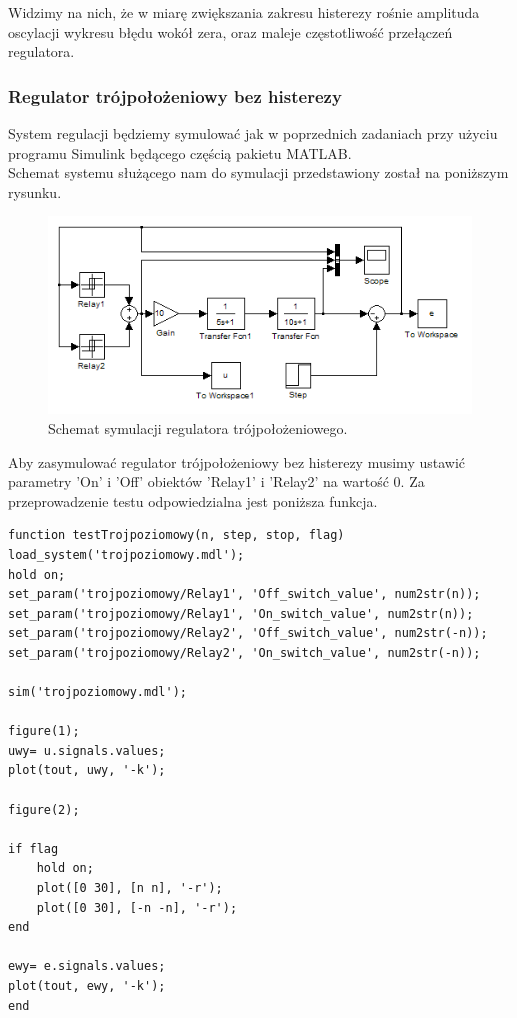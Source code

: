 \documentclass[a4paper,10pt]{article}
\begin{document}
\newpage Widzimy na nich, że w miarę zwiększania zakresu histerezy rośnie amplituda oscylacji wykresu błędu wokół zera, oraz maleje częstotliwość przełączeń regulatora.

\subsubsection{Regulator trójpołożeniowy bez histerezy}\label{sec:r3bh}%

System regulacji będziemy symulować jak w poprzednich zadaniach przy użyciu programu Simulink będącego częścią pakietu M\small ATLAB. \\
\normalsize Schemat systemu służącego nam do symulacji przedstawiony został na poniższym rysunku.

\begin{figure}[!h]
    \centering
	\includegraphics[width=120mm]{CW3-schemat-3.png}
	\caption{Schemat symulacji regulatora trójpołożeniowego.}
    \label{fig:Rysunek}
\end{figure}

Aby zasymulować regulator trójpołożeniowy bez histerezy musimy ustawić parametry 'On' i 'Off' obiektów 'Relay1' i 'Relay2' na wartość 0.
\newpage Za przeprowadzenie testu odpowiedzialna jest poniższa funkcja.

\begin{lstlisting}[caption=Funkcja testująca regulator trójpołożeniowy bez histerezy.]
function testTrojpoziomowy(n, step, stop, flag)
load_system('trojpoziomowy.mdl');
hold on;
set_param('trojpoziomowy/Relay1', 'Off_switch_value', num2str(n));
set_param('trojpoziomowy/Relay1', 'On_switch_value', num2str(n));
set_param('trojpoziomowy/Relay2', 'Off_switch_value', num2str(-n));
set_param('trojpoziomowy/Relay2', 'On_switch_value', num2str(-n));

sim('trojpoziomowy.mdl');

figure(1);
uwy= u.signals.values;    
plot(tout, uwy, '-k');

figure(2);

if flag
    hold on;
    plot([0 30], [n n], '-r');
    plot([0 30], [-n -n], '-r');
end

ewy= e.signals.values;    
plot(tout, ewy, '-k');
end
\end{lstlisting}
\end{document}
